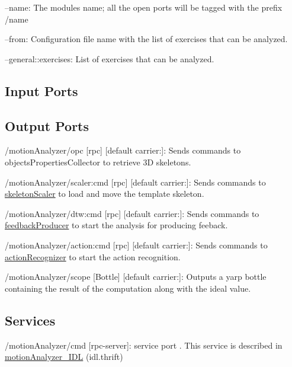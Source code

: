 \begin{DoxyItemize}
\item --name\+: The module\textquotesingle{}s name; all the open ports will be tagged with the prefix /name
\item --from\+: Configuration file name with the list of exercises that can be analyzed.
\item --general\+::exercises\+: List of exercises that can be analyzed. 
\end{DoxyItemize}\hypertarget{group__skeletonViewer_inputports_sec}{}\subsection{Input Ports}\label{group__skeletonViewer_inputports_sec}
\hypertarget{group__skeletonViewer_outputports_sec}{}\subsection{Output Ports}\label{group__skeletonViewer_outputports_sec}

\begin{DoxyItemize}
\item /motion\+Analyzer/opc \mbox{[}rpc\mbox{]} \mbox{[}default carrier\+:\mbox{]}\+: Sends commands to objects\+Properties\+Collector to retrieve 3D skeletons.
\item /motion\+Analyzer/scaler\+:cmd \mbox{[}rpc\mbox{]} \mbox{[}default carrier\+:\mbox{]}\+: Sends commands to \hyperlink{group__skeletonScaler}{skeleton\+Scaler} to load and move the template skeleton.
\item /motion\+Analyzer/dtw\+:cmd \mbox{[}rpc\mbox{]} \mbox{[}default carrier\+:\mbox{]}\+: Sends commands to \hyperlink{group__feedbackProducer}{feedback\+Producer} to start the analysis for producing feeback.
\item /motion\+Analyzer/action\+:cmd \mbox{[}rpc\mbox{]} \mbox{[}default carrier\+:\mbox{]}\+: Sends commands to \hyperlink{group__actionRecognizer}{action\+Recognizer} to start the action recognition.
\item /motion\+Analyzer/scope \mbox{[}Bottle\mbox{]} \mbox{[}default carrier\+:\mbox{]}\+: Outputs a yarp bottle containing the result of the computation along with the ideal value.
\end{DoxyItemize}\hypertarget{group__skeletonViewer_services_sec}{}\subsection{Services}\label{group__skeletonViewer_services_sec}

\begin{DoxyItemize}
\item /motion\+Analyzer/cmd \mbox{[}rpc-\/server\mbox{]}\+: service port . This service is described in \hyperlink{classmotionAnalyzer__IDL}{motion\+Analyzer\+\_\+\+I\+DL} (idl.\+thrift) 
\end{DoxyItemize}